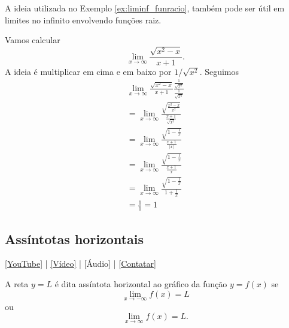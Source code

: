 A ideia utilizada no Exemplo \ref{ex:liminf_funracio}, também pode ser útil em limites no infinito envolvendo funções raiz.

\begin{ex}
  Vamos calcular
  \begin{equation}
    \lim_{x\to\infty}\frac{\sqrt{x^2-x}}{x+1}.
  \end{equation}
  A ideia é multiplicar em cima e em baixo por $1/\sqrt{x^2}$. Seguimos
  \begin{gather}
    \lim_{x\to\infty}\frac{\sqrt{x^2-x}}{x+1}\frac{\frac{1}{\sqrt{x^2}}}{\frac{1}{\sqrt{x^2}}}\\
    = \lim_{x\to\infty}\frac{\sqrt{\frac{x^2-x}{x^2}}}{\frac{x+1}{\sqrt{x^2}}}\\
    = \lim_{x\to\infty}\frac{\sqrt{1-\frac{1}{x}}}{\frac{x+1}{|x|}}\\
    = \lim_{x\to\infty}\frac{\sqrt{1-\frac{1}{x}}}{\frac{x+1}{x}}\\
    = \lim_{x\to\infty}\frac{\sqrt{1-\frac{1}{x}}}{1+\frac{1}{x}}\\
    = \frac{1}{1} = 1
  \end{gather}
\end{ex}

\subsection{Assíntotas horizontais}

\begin{flushright}
 \href{https://youtu.be/3OKV7PxGiGE}{[YouTube]} | \href{https://archive.org/details/video_20220715_1233}{[Vídeo]} | [Áudio] | \href{https://phkonzen.github.io/notas/contato.html}{[Contatar]}
\end{flushright}

A reta $y = L$ é dita assíntota horizontal ao gráfico da função $y = f(x)$ se
\begin{equation}
  \lim_{x\to -\infty} f(x) = L
\end{equation}
ou
\begin{equation}
  \lim_{x\to\infty} f(x) = L.
\end{equation}

